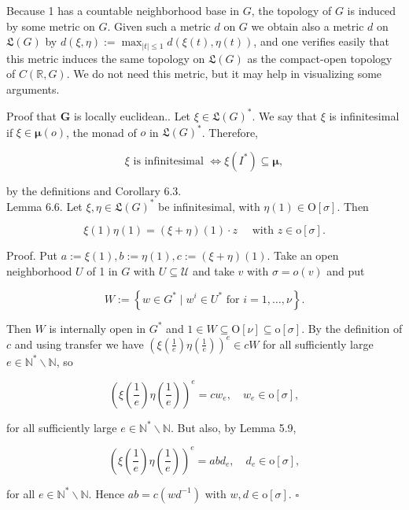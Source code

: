 \documentclass[10pt]{article}
\begin{document}
Because 1 has a countable neighborhood base in $G$, the topology of $G$ is induced by some metric on $G$. Given such a metric $d$ on $G$ we obtain also a metric $d$ on $\mathfrak{L}(G)$ by $d(\xi, \eta):=\max _{|t| \leq 1} d(\xi(t), \eta(t))$, and one verifies easily that this metric induces the same topology on $\mathfrak{L}(G)$ as the compact-open topology of $C(\mathbb{R}, G)$. We do not need this metric, but it may help in visualizing some arguments.

Proof that $\boldsymbol{G}$ is locally euclidean.. Let $\xi \in \mathfrak{L}(G)^{*}$. We say that $\xi$ is infinitesimal if $\xi \in \boldsymbol{\mu}(o)$, the monad of $o$ in $\mathfrak{L}(G)^{*}$. Therefore,

$$
\xi \text { is infinitesimal } \Longleftrightarrow \xi\left(I^{*}\right) \subseteq \boldsymbol{\mu},
$$

by the definitions and Corollary 6.3.\\
Lemma 6.6. Let $\xi, \eta \in \mathfrak{L}(G)^{*}$ be infinitesimal, with $\eta(1) \in \mathrm{O}[\sigma]$. Then

$$
\xi(1) \eta(1)=(\xi+\eta)(1) \cdot z \quad \text { with } z \in \mathrm{o}[\sigma] .
$$

Proof. Put $a:=\xi(1), b:=\eta(1), c:=(\xi+\eta)(1)$. Take an open neighborhood $U$ of 1 in $G$ with $U \subseteq \mathcal{U}$ and take $v$ with $\sigma=o(v)$ and put

$$
W:=\left\{w \in G^{*} \mid w^{i} \in U^{*} \text { for } i=1, \ldots, \nu\right\} .
$$

Then $W$ is internally open in $G^{*}$ and $1 \in W \subseteq \mathrm{O}[\nu] \subseteq \mathrm{o}[\sigma]$. By the definition of $c$ and using transfer we have $\left(\xi\left(\frac{1}{e}\right) \eta\left(\frac{1}{e}\right)\right)^{e} \in c W$ for all sufficiently large $e \in \mathbb{N}^{*} \backslash \mathbb{N}$, so

$$
\left(\xi\left(\frac{1}{e}\right) \eta\left(\frac{1}{e}\right)\right)^{e}=c w_{e}, \quad w_{e} \in \mathrm{o}[\sigma],
$$

for all sufficiently large $e \in \mathbb{N}^{*} \backslash \mathbb{N}$. But also, by Lemma 5.9,

$$
\left(\xi\left(\frac{1}{e}\right) \eta\left(\frac{1}{e}\right)\right)^{e}=a b d_{e}, \quad d_{e} \in \mathrm{o}[\sigma],
$$

for all $e \in \mathbb{N}^{*} \backslash \mathbb{N}$. Hence $a b=c\left(w d^{-1}\right)$ with $w, d \in \mathrm{o}[\sigma]$. \(\square\)
\end{document}
